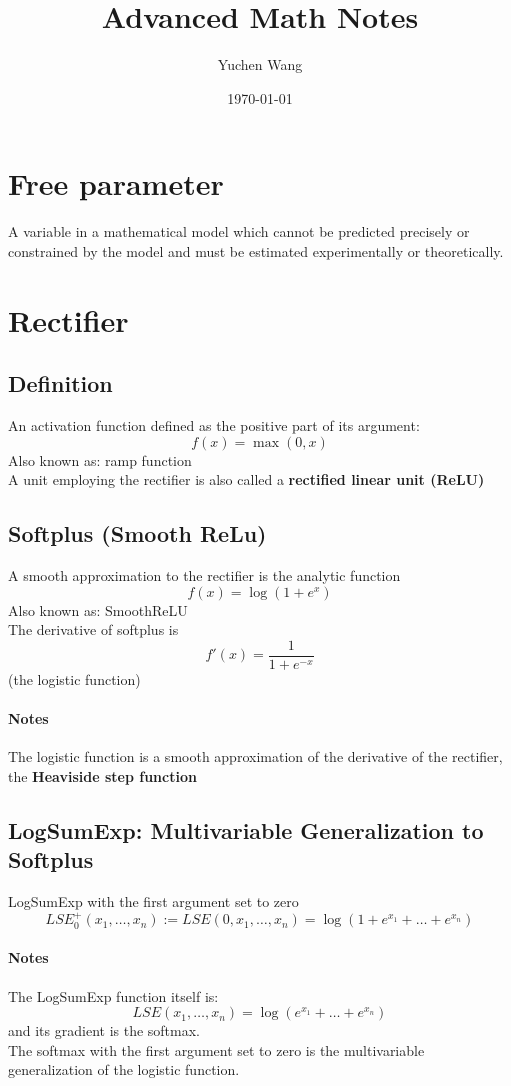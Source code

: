\documentclass[11pt]{article}
\title{Advanced Math Notes}
\author{Yuchen Wang}
\date{\today}
\newcommand{\tb}[1]{\textbf{#1}}
\begin{document}
	\maketitle
	\tableofcontents
	\newpage
	\section{Free parameter}
	A variable in a mathematical model which cannot be predicted precisely or constrained by the model and must be estimated experimentally or theoretically.
	\section{Rectifier}
	\subsection{Definition}
	An activation function defined as the positive part of its argument:
	$$f(x) = \max(0,x)$$
	Also known as: ramp function \\
	A unit employing the rectifier is also called a \tb{rectified linear unit (ReLU)}
	\subsection{Softplus (Smooth ReLu)}
	A smooth approximation to the rectifier is the analytic function $$f(x) = \log(1+e^x)$$
	Also known as: SmoothReLU\\
	The derivative of softplus is $$f'(x) = \frac{1}{1+e^{-x}}$$(the logistic function)
	\paragraph{Notes}
	The logistic function is a smooth approximation of the derivative of the rectifier, the \tb{Heaviside step function}
	\subsection{LogSumExp: Multivariable Generalization to Softplus}
	LogSumExp with the first argument set to zero
	$$LSE_0^+(x_1,\hdots,x_n) := LSE(0,x_1,\hdots,x_n) = \log(1+e^{x_1} + \hdots + e^{x_n})$$
	\paragraph{Notes}
	The LogSumExp function itself is:
	$$LSE(x_1,\hdots,x_n) = \log(e^{x_1} + \hdots + e^{x_n})$$
	and its gradient is the softmax.\\
	The softmax with the first argument set to zero is the multivariable generalization of the logistic function.
\end{document}
